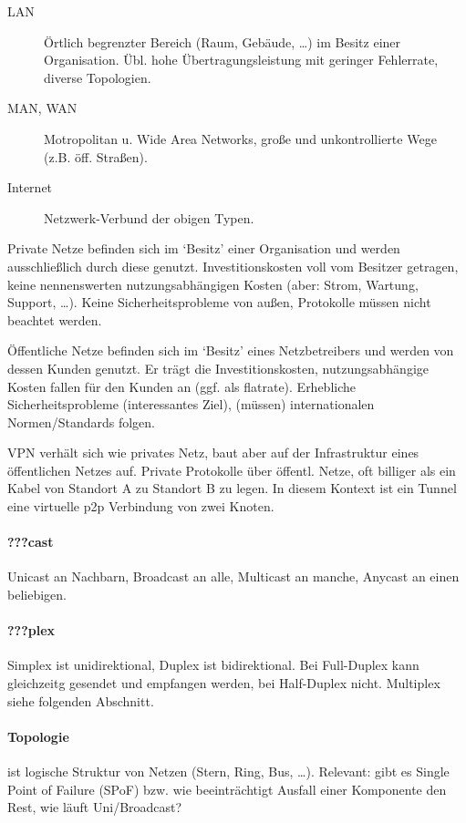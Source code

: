 \documentclass{article}
\begin{document}
\begin{multicols}{1}
\begin{description}
    \item[LAN] Örtlich begrenzter Bereich (Raum, Ge\-bäu\-de, \ldots) im Besitz einer Organisation. Übl. hohe Übertragungsleistung mit geringer Fehlerrate, diverse Topologien.
    \item[MAN, WAN] Motropolitan u. Wide Area Networks, große und unkontrollierte Wege (z.B. öff. Straßen).
    \item[Internet] Netzwerk-Verbund der obigen Typen.
\end{description}

Private Netze befinden sich im \enquote*{Besitz} einer Organisation und werden ausschließlich durch diese genutzt. Investitionskosten voll vom Besitzer getragen, keine nennenswerten nutzungsabhängigen Kosten (aber: Strom, Wartung, Support, \ldots). Keine Sicherheitsprobleme von außen, Protokolle müssen nicht beachtet werden.

Öffentliche Netze befinden sich im \enquote*{Besitz} eines Netzbetreibers und werden von dessen Kunden genutzt. Er trägt die Investitionskosten, nutzungsabhängige Kosten fallen für den Kunden an (ggf. als flatrate). Erhebliche Sicherheitsprobleme (interessantes Ziel), (müssen) internationalen Normen/Standards folgen.

VPN verhält sich wie privates Netz, baut aber auf der Infrastruktur eines öffentlichen Netzes auf. Private Protokolle über öffentl. Netze, oft billiger als ein Kabel von Standort A zu Standort B zu legen. In diesem Kontext ist ein Tunnel eine virtuelle p2p Verbindung von zwei Knoten.

\paragraph{???cast} Unicast an Nachbarn, Broadcast an alle, Multicast an manche, Anycast an einen beliebigen.

\paragraph{???plex} Simplex ist unidirektional, Duplex ist bidirektional. Bei Full-Duplex kann gleichzeitg gesendet und empfangen werden, bei Half-Duplex nicht. Multiplex siehe folgenden Abschnitt.

\paragraph{Topologie} ist logische Struktur von Netzen (Stern, Ring, Bus, \ldots). Relevant: gibt es Single Point of Failure (SPoF) bzw. wie beeinträchtigt Ausfall einer Komponente den Rest, wie läuft Uni/Broadcast?


\end{multicols}
\end{document}

